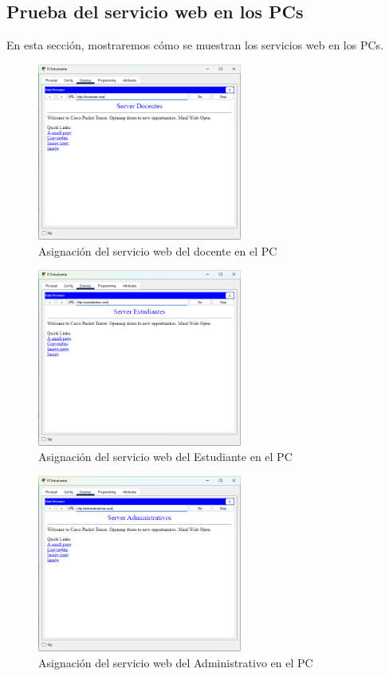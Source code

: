     \subsection*{Prueba del servicio web en los PCs}
    En esta sección, mostraremos cómo se muestran los servicios web en los PCs.
    \begin{figure}[H]
        \centering
        \includegraphics[width=0.6\textwidth]{img/wedDocEs.png}
        \caption{Asignación del servicio web del docente en el PC}
        \label{fig:pcdweb}
    \end{figure}
    \begin{figure}[H]
        \centering
        \includegraphics[width=0.6\textwidth]{img/web estudiantes.png}
        \caption{Asignación del servicio web del Estudiante en el PC}
        \label{fig:pceweb}
    \end{figure}
    \begin{figure}[H]
        \centering
        \includegraphics[width=0.6\textwidth]{img/web adminis.png}
        \caption{Asignación del servicio web del Administrativo en el PC}
        \label{fig:pcAweb}
    \end{figure}



